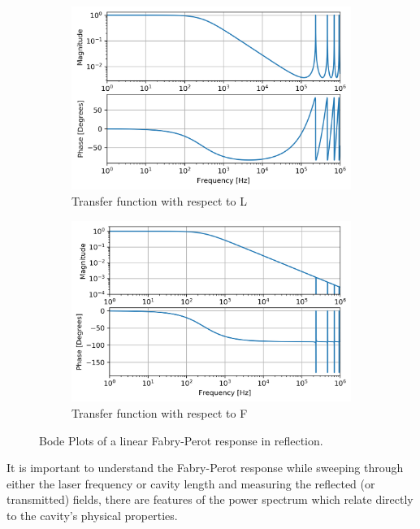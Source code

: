 		\begin{figure}[ht]
			\centering
			\begin{subfigure}[b]{0.45\textwidth}
				\centering
				\includegraphics[width=\textwidth]{../Figures/FP_L_TF.png}
				\caption{Transfer function with respect to L}
				\label{fig:FP_L}
			\end{subfigure}
			\hfill
			\begin{subfigure}[b]{0.45\textwidth}
				\centering
				\includegraphics[width=\textwidth]{../Figures/FP_F_TF.png}
				\caption{Transfer function with respect to F}
				\label{fig:FP_F}
			\end{subfigure}
			\caption{Bode Plots of a linear Fabry-Perot response in reflection.}
			\label{fig:FP_Bode}
		\end{figure}
		It is important to understand the Fabry-Perot response while sweeping through either the laser frequency or cavity length and measuring the reflected (or transmitted) fields, there are features of the power spectrum which relate directly to the cavity's physical properties.
		
